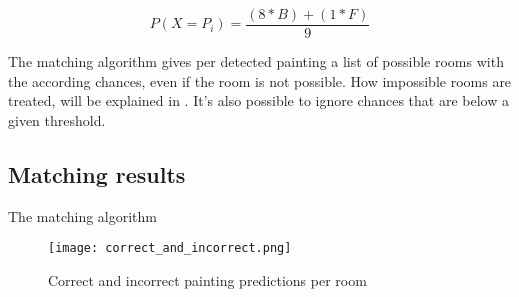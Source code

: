 \begin{equation}
    \label{eq:histogram-score}
    P(X = P_{i}) = \frac{(8 * B) + (1 * F)}{9}
\end{equation}

The matching algorithm gives per detected painting a list of possible rooms with the according chances, even if the room is not possible. How impossible rooms are treated, will be explained in . It's also possible to ignore chances that are below a given threshold.

\subsection{Matching results}
The matching algorithm

\begin{figure}
    \centering
    \texttt{[image: correct\_and\_incorrect.png]}

    \caption{Correct and incorrect painting predictions per room}
    \label{fig:correct-incorrect-paintings}
\end{figure}
